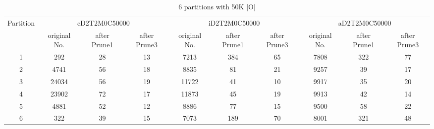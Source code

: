 \begin{table*}[t]
  \centering
\makeatletter
    \long{}
\makeatother
  \caption{6 partitions with 50K |O|}
    \vspace*{3pt}
  \footnotesize

  \label{table:partition6}
  \begin{tabular}{|c||c|c|c|c|c|c|c|c|c|}
  \hline
  \multirow{2}{*}{Partition} &  \multicolumn{3}{|c|}{cD2T2M0C50000} & \multicolumn{3}{|c|}{iD2T2M0C50000} &\multicolumn{3}{|c|}{aD2T2M0C50000} \\\cline{2-10}
    &  original No. & after Prune1 & after Prune3 & original No. & after Prune1 & after Prune3 & original No. & after Prune1 & after Prune3\\\hline\hline

\cline{2-10}
    1 &  292 & 28 & 13 & 7213 & 384 & 65 & 7808  & 322 & 77 \\\hline

\cline{2-10}
    2 &  4741 & 56 & 18 & 8835 & 81 & 21 & 9257 & 39 & 17 \\\hline

\cline{2-10}
    3 &  24034 & 56 & 19 & 11722 & 41 & 10 & 9917 & 35 & 20 \\\hline
    
\cline{2-10}
    4 &  23902 & 72 & 17 & 11873 & 45 & 19 & 9913 & 42 & 14 \\\hline

\cline{2-10}
    5 &  4881 & 52 & 12 & 8886 & 77 & 15 & 9500 & 58 & 22 \\\hline

\cline{2-10}
    6 &  322 & 39 & 15 & 7073 & 189 & 70 & 8001 & 321 & 48 \\\hline

  \end{tabular}
  \vspace*{-17pt}
\end{table*}


